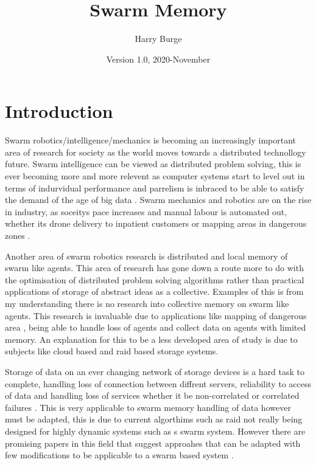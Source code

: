 \documentclass{UoYCSproject}
\author{Harry Burge}
\title{Swarm Memory}
\date{Version 1.0, 2020-November}
\begin{document}
\maketitle
\listoffigures
\listoftables



\begin{summary}

\end{summary}


\chapter{Introduction}
\label{cha:Introduction}

Swarm robotics/intelligence/mechanics is becoming an increasingly important area of research for society as the world moves towards a distributed technollogy future.
Swarm intelligence can be viewed as distributed problem solving\cite{Cognitive maps mine detection, Swarm intellegiegence}, this is ever becoming more and more relevent as computer systems start to level out in terms of indurvidual performance  \cite{CPU speed} and parrelism is inbraced to be able to satisfy the demand of the age of big data \cite{Avalability storage}. 
Swarm mechanics and robotics are on the rise in industry, as soceitys pace increases and manual labour is automated out, whether its drone delivery to inpatient customers or mapping areas in dangerous zones \cite{Swarm robotics reviewed}.

Another area of swarm robotics research is distributed and local memory of swarm like agents. 
This area of research has gone down a route more to do with the optimisation of distributed problem solving algorithms rather than practical applications of storage of abstract ideas as a collective. 
Examples of this is from my understanding there is no research into collective memory on swarm like agents. 
This research is invaluable due to applications like mapping of dangerous area \cite{Cognitive maps mine detection}, being able to handle loss of agents and collect data on agents with limited memory. 
An explanation for this to be a less developed area of study is due to subjects like cloud based and raid based storage systems.

Storage of data on an ever changing network of storage devices is a hard task to complete, handling loss of connection between diffrent servers, reliability to access of data and handling loss of services whether it be non-correlated or correlated failures \cite{Avalability storage}. 
This is very applicable to swarm memory handling of data however must be adapted, this is due to current algorthims such as raid not really being designed for highly dynamic systems such as s swarm system. 
However there are promising papers in this field that suggest approahes that can be adapted with few modifications to be applicable to a swarm based system \cite{Distributed Storage}. 
\end{document}
